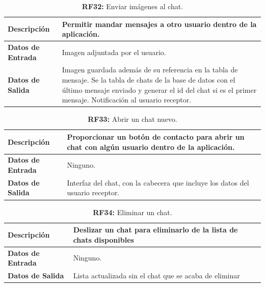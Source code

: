 \documentclass[a4paper, 12pt]{article}
\begin{document}
\begin{table}[H]
\captionsetup{list=no}%
\captionsetup{justification=raggedright,singlelinecheck=false}
\captionsetup{labelformat=empty}
\caption{\textbf{RF32:} Enviar imágenes al chat.}
\label{tab:RF32}
	\begin{tabular}{|m{5cm}|m{10cm}|}
\hline
	\textbf{Descripción} & Permitir mandar mensajes a otro usuario dentro de la aplicación. \\ 
	\hline
	\textbf{Datos de Entrada} & Imagen adjuntada por el usuario. \\ 
	\hline
	\textbf{Datos de Salida} & Imagen guardada además de su referencia en la tabla de mensaje. Se la tabla de chats de la base de datos con el último mensaje enviado y generar el id del chat si es el primer mensaje. Notificación al usuario receptor. \\ 
	\hline
\end{tabular}
\end{table}


\begin{table}[H]
\captionsetup{list=no}%
\captionsetup{justification=raggedright,singlelinecheck=false}
\captionsetup{labelformat=empty}
\caption{\textbf{RF33:} Abrir un chat nuevo.}
\label{tab:RF33}
	\begin{tabular}{|m{5cm}|m{10cm}|}
	\hline
	\textbf{Descripción} & Proporcionar un botón de contacto para abrir un chat con algún usuario dentro de la aplicación. \\ 
	\hline
	\textbf{Datos de Entrada} & Ninguno. \\ 
	\hline
	\textbf{Datos de Salida} & Interfaz del chat, con la cabecera que incluye los datos del usuario receptor. \\ 
	\hline
\end{tabular}
\end{table}

\begin{table}[H]
\captionsetup{list=no}%
\captionsetup{justification=raggedright,singlelinecheck=false}
\captionsetup{labelformat=empty}
\caption{\textbf{RF34:} Eliminar un chat.}
\label{tab:RF34}
	\begin{tabular}{|m{5cm}|m{10cm}|}
	\hline
	\textbf{Descripción} & Deslizar un chat para eliminarlo de la lista de chats disponibles \\ 
	\hline
	\textbf{Datos de Entrada} & Ninguno. \\ 
	\hline
	\textbf{Datos de Salida} & Lista actualizada sin el chat que se acaba de eliminar \\ 
	\hline
\end{tabular}
\end{table}
\end{document}
